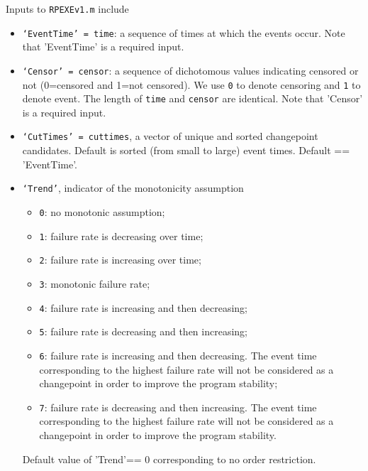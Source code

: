 \documentclass[12pt] {article}
\begin{document}
Inputs to {\tt RPEXEv1.m} include
\begin{itemize}
\item {\tt `EventTime' = time}: a sequence of times at which the events occur. Note that 'EventTime' is a required input.
\item {\tt `Censor' = censor}: a sequence of dichotomous values indicating censored or not (0=censored and 1=not censored).
    We use {\tt 0} to denote censoring and {\tt 1} to denote event. The length of {\tt time} and {\tt censor} are identical. Note that 'Censor' is a required input.
\item {\tt `CutTimes' = cuttimes}, a vector of unique and sorted changepoint candidates. Default is sorted (from small to large) event times. Default == 'EventTime'.
\item {\tt `Trend'}, indicator of the monotonicity assumption
    \begin{itemize}
        \item {\tt 0}: no monotonic assumption;
        \item {\tt 1}: failure rate is decreasing over time;
        \item {\tt 2}: failure rate is increasing over time;
        \item {\tt 3}: monotonic failure rate;
        \item {\tt 4}: failure rate is increasing and then decreasing;
        \item {\tt 5}: failure rate is decreasing and then increasing;
        \item {\tt 6}: failure rate is increasing and then decreasing. The event time corresponding to the highest failure rate will not be considered as a changepoint in order to improve the program stability;
        \item {\tt 7}: failure rate is decreasing and then increasing. The event time corresponding to the highest failure rate will not be considered as a changepoint in order to improve the program stability.
    \end{itemize}
    Default value of 'Trend'== 0 corresponding to no order restriction.
\end{itemize}
\end{document}
